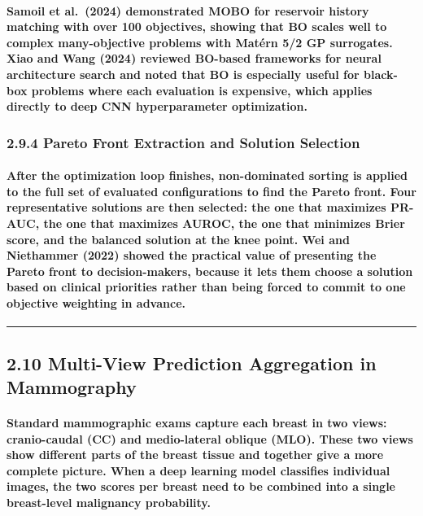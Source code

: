 \paragraph{Samoil et al. (2024) demonstrated MOBO for reservoir history matching with over 100 objectives, showing that BO scales well to complex many-objective problems with Matérn 5/2 GP surrogates. Xiao and Wang (2024) reviewed BO-based frameworks for neural architecture search and noted that BO is especially useful for black-box problems where each evaluation is expensive, which applies directly to deep CNN hyperparameter optimization.}

\subsubsection{2.9.4 Pareto Front Extraction and Solution
Selection}\label{pareto-front-extraction-and-solution-selection}

\paragraph{After the optimization loop finishes, non-dominated sorting is applied to the full set of evaluated configurations to find the Pareto front. Four representative solutions are then selected: the one that maximizes PR-AUC, the one that maximizes AUROC, the one that minimizes Brier score, and the balanced solution at the knee point. Wei and Niethammer (2022) showed the practical value of presenting the Pareto front to decision-makers, because it lets them choose a solution based on clinical priorities rather than being forced to commit to one objective weighting in advance.}

\begin{center}\rule{0.5\linewidth}{0.5pt}\end{center}

\subsection{2.10 Multi-View Prediction Aggregation in
Mammography}\label{multi-view-prediction-aggregation-in-mammography}

\paragraph{Standard mammographic exams capture each breast in two views: cranio-caudal (CC) and medio-lateral oblique (MLO). These two views show different parts of the breast tissue and together give a more complete picture. When a deep learning model classifies individual images, the two scores per breast need to be combined into a single breast-level malignancy probability.}


